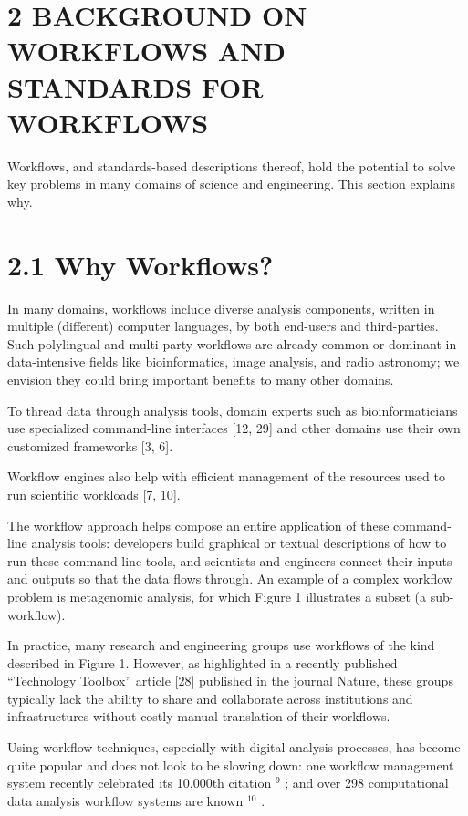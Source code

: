 \documentclass[
]{article}
\begin{document}
\section{2 BACKGROUND ON WORKFLOWS AND STANDARDS FOR
WORKFLOWS}\label{background-on-workflows-and-standards-for-workflows}

Workflows, and standards-based descriptions thereof, hold the potential
to solve key problems in many domains of science and engineering. This
section explains why.

\section{2.1 Why Workflows?}\label{why-workflows}

In many domains, workflows include diverse analysis components, written
in multiple (different) computer languages, by both end-users and
third-parties. Such polylingual and multi-party workflows are already
common or dominant in data-intensive fields like bioinformatics, image
analysis, and radio astronomy; we envision they could bring important
benefits to many other domains.

To thread data through analysis tools, domain experts such as
bioinformaticians use specialized command-line interfaces {[}12, 29{]}
and other domains use their own customized frameworks {[}3, 6{]}.

Workflow engines also help with efficient management of the resources
used to run scientific workloads {[}7, 10{]}.

The workflow approach helps compose an entire application of these
command-line analysis tools: developers build graphical or textual
descriptions of how to run these command-line tools, and scientists and
engineers connect their inputs and outputs so that the data flows
through. An example of a complex workflow problem is metagenomic
analysis, for which Figure 1 illustrates a subset (a sub-workflow).

In practice, many research and engineering groups use workflows of the
kind described in Figure 1. However, as highlighted in a recently
published ``Technology Toolbox'' article {[}28{]} published in the
journal Nature, these groups typically lack the ability to share and
collaborate across institutions and infrastructures without costly
manual translation of their workflows.

Using workflow techniques, especially with digital analysis processes,
has become quite popular and does not look to be slowing down: one
workflow management system recently celebrated its 10,000th citation
\(^{9}\) ; and over 298 computational data analysis workflow systems are
known \(^{10}\) .
\end{document}

